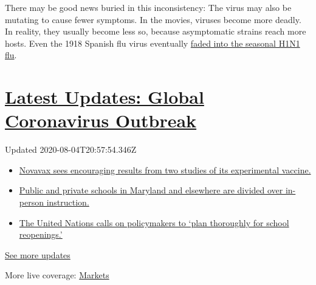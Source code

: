 There may be good news buried in this inconsistency: The virus may also
be mutating to cause fewer symptoms. In the movies, viruses become more
deadly. In reality, they usually become less so, because asymptomatic
strains reach more hosts. Even the 1918 Spanish flu virus eventually
\href{https://www.ncbi.nlm.nih.gov/pmc/articles/PMC3180813/}{faded into
the seasonal H1N1 flu}.

\hypertarget{latest-updates-global-coronavirus-outbreak}{%
\section{\texorpdfstring{\href{https://www.nytimes.com/2020/08/04/world/coronavirus-cases.html?action=click\&pgtype=Article\&state=default\&region=MAIN_CONTENT_1\&context=storylines_live_updates}{Latest
Updates: Global Coronavirus
Outbreak}}{Latest Updates: Global Coronavirus Outbreak}}\label{latest-updates-global-coronavirus-outbreak}}

Updated 2020-08-04T20:57:54.346Z

\begin{itemize}
\tightlist
\item
  \href{https://www.nytimes.com/2020/08/04/world/coronavirus-cases.html?action=click\&pgtype=Article\&state=default\&region=MAIN_CONTENT_1\&context=storylines_live_updates\#link-1228a480}{Novavax
  sees encouraging results from two studies of its experimental
  vaccine.}
\item
  \href{https://www.nytimes.com/2020/08/04/world/coronavirus-cases.html?action=click\&pgtype=Article\&state=default\&region=MAIN_CONTENT_1\&context=storylines_live_updates\#link-4825b93}{Public
  and private schools in Maryland and elsewhere are divided over
  in-person instruction.}
\item
  \href{https://www.nytimes.com/2020/08/04/world/coronavirus-cases.html?action=click\&pgtype=Article\&state=default\&region=MAIN_CONTENT_1\&context=storylines_live_updates\#link-50f7386d}{The
  United Nations calls on policymakers to `plan thoroughly for school
  reopenings.'}
\end{itemize}

\href{https://www.nytimes.com/2020/08/04/world/coronavirus-cases.html?action=click\&pgtype=Article\&state=default\&region=MAIN_CONTENT_1\&context=storylines_live_updates}{See
more updates}

More live coverage:
\href{https://www.nytimes.com/live/2020/08/04/business/stock-market-today-coronavirus?action=click\&pgtype=Article\&state=default\&region=MAIN_CONTENT_1\&context=storylines_live_updates}{Markets}


